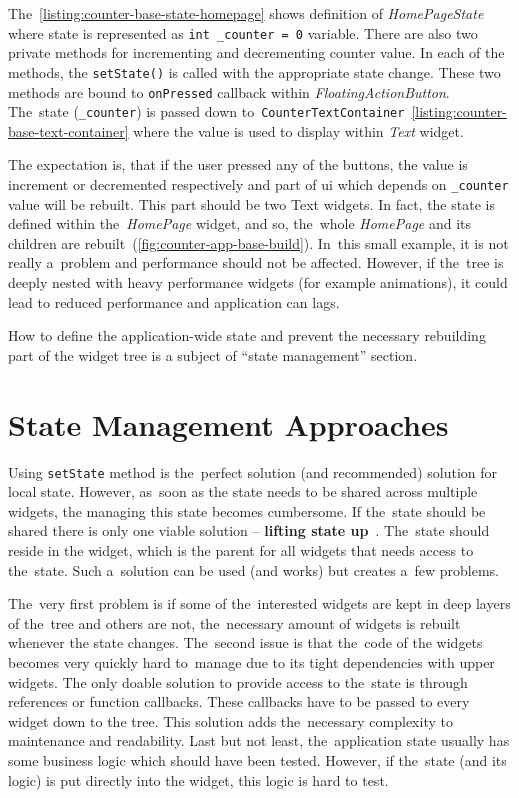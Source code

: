 The~\cref{listing:counter-base-state-homepage} shows definition of \textit{HomePageState} where state is represented as \verb|int _counter = 0| variable. There are also two private methods for incrementing and decrementing counter value. In each of the methods, the \verb|setState()| is called with the appropriate state change.  These two methods are bound to \verb|onPressed| callback within \textit{FloatingActionButton}. The~state (\verb|_counter|) is passed down to~\verb|CounterTextContainer|~\cref{listing:counter-base-text-container} where the value is used to display within \textit{Text} widget. 

The expectation is, that if the user pressed any of the buttons, the value is increment or decremented respectively and part of \gls{ui} which depends on \verb|_counter| value will be rebuilt. This part should be two Text widgets. In fact, the state is defined within the~\textit{HomePage} widget, and so, the~whole \textit{HomePage} and its children are rebuilt~(\cref{fig:counter-app-base-build}). In~this small example, it is not really a~problem and performance should not be affected. However, if the~tree is deeply nested with heavy performance widgets (for example animations), it could lead to reduced performance and application can lags. 

How to define the application-wide state and prevent the necessary rebuilding part of the widget tree is a subject of ``state management'' section.
\section{State Management Approaches}
Using \verb|setState| method is the~perfect solution (and recommended) solution for local state. However, as~soon as the state needs to be shared across multiple widgets, the managing this state becomes cumbersome. If the~state should be shared there is only one viable solution -- \textbf{lifting state up}~\cite{flutter-simple-state-management}. The~state should reside in the widget, which is the parent for all widgets that needs access to the~state. Such a~solution can be used (and works) but creates a~few problems. 

The~very first problem is if some of the~interested widgets are kept in deep layers of the~tree and others are not, the~necessary amount of widgets is rebuilt whenever the state changes. The~second issue is that the~code of the widgets becomes very quickly hard to~manage due to its tight dependencies with upper widgets. The only doable solution to provide access to the~state is through references or function callbacks. These callbacks have to be passed to every widget down to the tree. This solution adds the~necessary complexity to maintenance and readability. Last but not least, the~application state usually has some business logic which should have been tested. However, if the~state (and its logic) is put directly into the widget, this logic is hard to test. 

